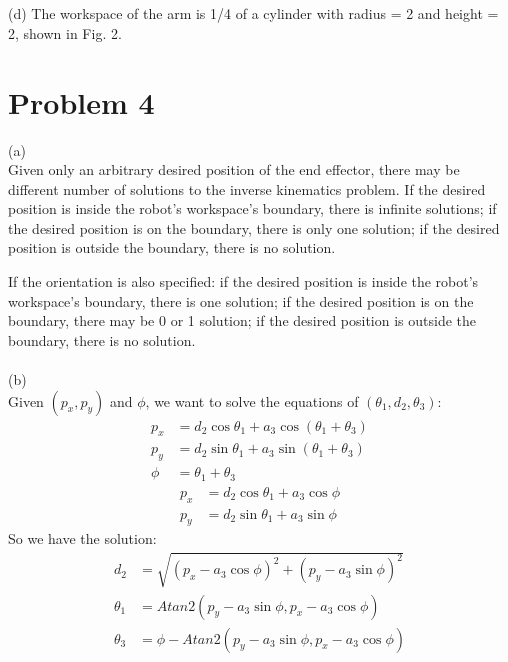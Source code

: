\documentclass[twoside,11pt]{homework}
\begin{document}
\\\\
(d)
The workspace of the arm is 1/4 of a cylinder with radius = 2 and height = 2, shown in Fig. 2.

\section*{Problem 4}
(a)\\
Given only an arbitrary desired position of the end effector, there may be different number of solutions to the inverse kinematics problem.
If the desired position is inside the robot's workspace's boundary, there is infinite solutions;
if the desired position is on the boundary, there is only one solution;
if the desired position is outside the boundary, there is no solution.

If the orientation is also specified: 
if the desired position is inside the robot's workspace's boundary, there is one solution;
if the desired position is on the boundary, there may be 0 or 1 solution;
if the desired position is outside the boundary, there is no solution.
\\\\
(b)\\
Given $(p_x, p_y)$ and $\phi$, we want to solve the equations of $(\theta_1, d_2, \theta_3)$:
%
\begin{equation}
\begin{split}
p_x &= d_2 \cos \theta_1 + a_3 \cos(\theta_1 + \theta_3) \\
p_y &= d_2 \sin \theta_1 + a_3 \sin(\theta_1 + \theta_3) \\
\phi &= \theta_1 + \theta_3
\end{split}
\end{equation}
%
\begin{equation}
\begin{split}
p_x &= d_2 \cos \theta_1 + a_3 \cos \phi \\
p_y &= d_2 \sin \theta_1 + a_3 \sin \phi
\end{split}
\end{equation}
So we have the solution:
%
\begin{equation}
\begin{split}
d_2 &= \sqrt{(p_x - a_3 \cos \phi)^2 + (p_y - a_3 \sin\phi)^2}\\
\theta_1 &= Atan2 (p_y - a_3 \sin\phi, p_x - a_3 \cos \phi) \\
\theta_3 &= \phi - Atan2 (p_y - a_3 \sin\phi, p_x - a_3 \cos \phi)
\end{split}
\end{equation}
%
\end{document}
